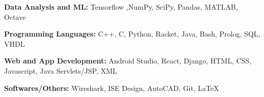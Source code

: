 \begin{cventries}
  \cventry
    {}
    {}
    {}
    {}
    {
    \vspace{-0.3cm}
      \begin{cvitems}
        \item{\textbf{Data Analysis and ML:} \hspace{14.5mm}  Tensorflow ,NumPy, SciPy, Pandas, MATLAB, Octave}
        \vspace{0.5mm}
        \item {\textbf{Programming Languages:} \hspace{0.9cm} C++, C, Python, Racket, Java, Bash, Prolog, SQL, VHDL}
        \vspace{0.5mm}
        \item{\textbf{Web and App Development:} \hspace{4mm} Android Studio, React, Django, HTML, CSS, Javascript, Java Servlets/JSP, XML}
        \vspace{0.5mm}
        \item{\textbf{Softwares/Others:}  \hspace{2cm}  Wireshark, ISE Design, AutoCAD, Git, \LaTeX}
      \end{cvitems}
    }
\end{cventries}